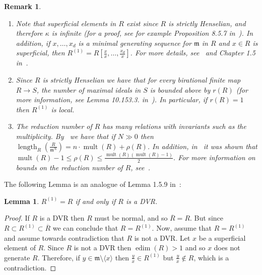 \documentclass{article}
\newtheorem{lemma}[theorem]{Lemma}
\newtheorem{remark}[theorem]{Remark}
\DeclareMathOperator{\length}{length}
\DeclareMathOperator{\edim}{edim}
\DeclareMathOperator{\mult}{mult}
\numberwithin{theorem}{section}
\begin{document}
\begin{remark}\label{rem:reduction}
\begin{enumerate}
    \item \textup{Note that superficial elements in $R$ exist since $R$ is strictly Henselian, and therefore $\kappa$ is infinite (for a proof, see for example Proposition 8.5.7 in~\cite{huneke2006integral}). In addition, if $x, \dots, x_d$ is a minimal generating sequence for $\mathfrak{m}$ in $R$ and $x \in R$ is superficial, then $R^{(1)} = R[\frac{x}{x}, \dots, \frac{x_d}{x}]$. For more details, see~\cite{northcott1956general} and Chapter 1.5 in~\cite{campillo2006algebroid}. }
    \item \textup{Since $R$ is strictly Henselian we have that for every birational finite map $R \to S$, the number of maximal ideals in $S$ is bounded above by $r(R)$ (for more information, see Lemma 10.153.3. in~\cite{stacks-project}). In particular, if $r(R)=1$ then $R^{(1)}$ is local. }
    \item \textup{The reduction number of $R$ has many relations with invariants such as the multiplicity. By~\cite{northcott1959reduction} we have that if $N \gg 0$ then $\length_R\left(\frac{R}{\mathfrak{m}^N}\right) = n \cdot \mult(R) + \rho(R)$. In addition, in~\cite{kirby1975reduction} it was shown that $\mult(R)-1 \leq \rho(R) \leq \frac{\mult(R) (\mult(R)-1)}{2}$. For more information on bounds on the reduction number of $R$, see~\cite{elias1990characterization}. }
\end{enumerate}
\end{remark}

The following Lemma is an analogue of Lemma 1.5.9 in~\cite{campillo2006algebroid}:

\begin{lemma}\label{lem:reg_blowup}
    $R^{(1)}=R$ if and only if $R$ is a DVR. 
\end{lemma}
\begin{proof}
    If $R$ is a DVR then $R$ must be normal, and so $\overline{R}=R$. But since $R \subset R^{(1)} \subset \overline{R}$ we can conclude that $R=R^{(1)}$. Now, assume that $R=R^{(1)}$ and assume towards contradiction that $R$ is not a DVR. Let $x$ be a superficial element of $R$. Since $R$ is not a DVR then $\edim(R)>1$ and so $x$ does not generate $R$. Therefore, if $y \in \mathfrak{m} \setminus \langle x \rangle$ then $\frac{y}{x} \in R^{(1)}$ but $\frac{y}{x} \notin R$, which is a contradiction. 
\end{proof}
\end{document}
